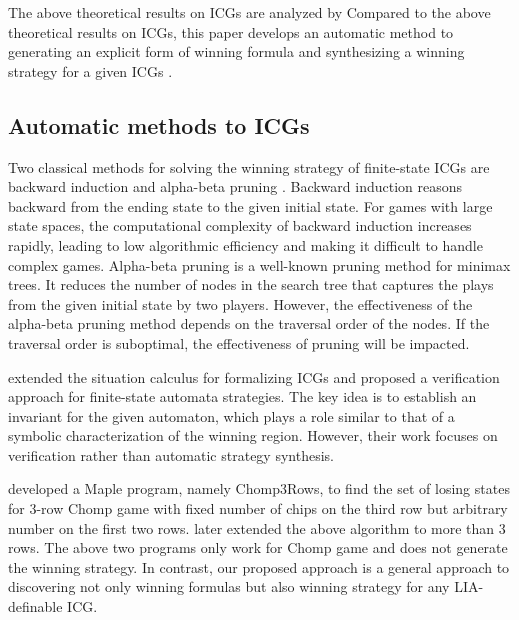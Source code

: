 \documentclass[review]{elsarticle}
\begin{document}
The above theoretical results on ICGs are analyzed by 
Compared to the above theoretical results on ICGs, this paper develops an automatic method to generating an explicit form of winning formula and synthesizing a winning strategy for a given ICGs .


\subsection{Automatic methods to ICGs}
Two classical methods for solving the winning strategy of finite-state ICGs are backward induction \cite{Wat2002} and alpha-beta pruning \cite{BelM2020}.
Backward induction reasons backward from the ending state to the given initial state. 
For games with large state spaces, the computational complexity of backward induction increases rapidly, leading to low algorithmic efficiency and making it difficult to handle complex games. 
Alpha-beta pruning is a well-known pruning method for minimax trees. 
It reduces the number of nodes in the search tree that captures the plays from the given initial state by two players. 
However, the effectiveness of the alpha-beta pruning method depends on the traversal order of the nodes. 
If the traversal order is suboptimal, the effectiveness of pruning will be impacted. 


\citet{LuoL2019} extended the situation calculus for formalizing ICGs and proposed a verification approach for finite-state automata strategies. 
The key idea is to establish an invariant for the given automaton, which plays a role similar to that of a symbolic characterization of the winning region. 
However, their work focuses on verification rather than automatic strategy synthesis.

\citet{Zei2001} developed a Maple program, namely Chomp3Rows, to find the set of losing states for $3$-row Chomp game with fixed number of chips on the third row but arbitrary number on the first two rows.
\citet{Sun2002} later extended the above algorithm to more than $3$ rows. 
The above two programs only work for Chomp game and does not generate the winning strategy.
In contrast, our proposed approach is a general approach to discovering not only winning formulas but also winning strategy for any LIA-definable ICG.

\end{document}
